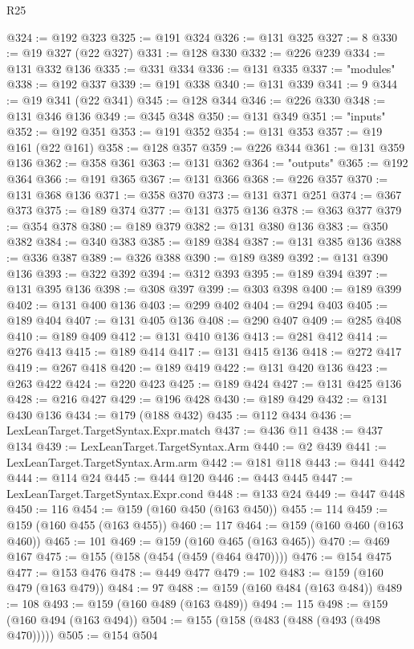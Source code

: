\begin{lexlean}{R25}
\begin{coremodule}
@324 := @192 @323
@325 := @191 @324
@326 := @131 @325
@327 := 8
@330 := @19 @327 (@22 @327)
@331 := @128 @330
@332 := @226 @239
@334 := @131 @332 @136
@335 := @331 @334
@336 := @131 @335
@337 := "modules"
@338 := @192 @337
@339 := @191 @338
@340 := @131 @339
@341 := 9
@344 := @19 @341 (@22 @341)
@345 := @128 @344
@346 := @226 @330
@348 := @131 @346 @136
@349 := @345 @348
@350 := @131 @349
@351 := "inputs"
@352 := @192 @351
@353 := @191 @352
@354 := @131 @353
@357 := @19 @161 (@22 @161)
@358 := @128 @357
@359 := @226 @344
@361 := @131 @359 @136
@362 := @358 @361
@363 := @131 @362
@364 := "outputs"
@365 := @192 @364
@366 := @191 @365
@367 := @131 @366
@368 := @226 @357
@370 := @131 @368 @136
@371 := @358 @370
@373 := @131 @371 @251
@374 := @367 @373
@375 := @189 @374
@377 := @131 @375 @136
@378 := @363 @377
@379 := @354 @378
@380 := @189 @379
@382 := @131 @380 @136
@383 := @350 @382
@384 := @340 @383
@385 := @189 @384
@387 := @131 @385 @136
@388 := @336 @387
@389 := @326 @388
@390 := @189 @389
@392 := @131 @390 @136
@393 := @322 @392
@394 := @312 @393
@395 := @189 @394
@397 := @131 @395 @136
@398 := @308 @397
@399 := @303 @398
@400 := @189 @399
@402 := @131 @400 @136
@403 := @299 @402
@404 := @294 @403
@405 := @189 @404
@407 := @131 @405 @136
@408 := @290 @407
@409 := @285 @408
@410 := @189 @409
@412 := @131 @410 @136
@413 := @281 @412
@414 := @276 @413
@415 := @189 @414
@417 := @131 @415 @136
@418 := @272 @417
@419 := @267 @418
@420 := @189 @419
@422 := @131 @420 @136
@423 := @263 @422
@424 := @220 @423
@425 := @189 @424
@427 := @131 @425 @136
@428 := @216 @427
@429 := @196 @428
@430 := @189 @429
@432 := @131 @430 @136
@434 := @179 (@188 @432)
@435 := @112 @434
@436 := LexLeanTarget.TargetSyntax.Expr.match
@437 := @436 @11
@438 := @437 @134
@439 := LexLeanTarget.TargetSyntax.Arm
@440 := @2 @439
@441 := LexLeanTarget.TargetSyntax.Arm.arm
@442 := @181 @118
@443 := @441 @442
@444 := @114 @24
@445 := @444 @120
@446 := @443 @445
@447 := LexLeanTarget.TargetSyntax.Expr.cond
@448 := @133 @24
@449 := @447 @448
@450 := 116
@454 := @159 (@160 @450 (@163 @450))
@455 := 114
@459 := @159 (@160 @455 (@163 @455))
@460 := 117
@464 := @159 (@160 @460 (@163 @460))
@465 := 101
@469 := @159 (@160 @465 (@163 @465))
@470 := @469 @167
@475 := @155 (@158 (@454 (@459 (@464 @470))))
@476 := @154 @475
@477 := @153 @476
@478 := @449 @477
@479 := 102
@483 := @159 (@160 @479 (@163 @479))
@484 := 97
@488 := @159 (@160 @484 (@163 @484))
@489 := 108
@493 := @159 (@160 @489 (@163 @489))
@494 := 115
@498 := @159 (@160 @494 (@163 @494))
@504 := @155 (@158 (@483 (@488 (@493 (@498 @470)))))
@505 := @154 @504

\end{coremodule}
\end{lexlean}
